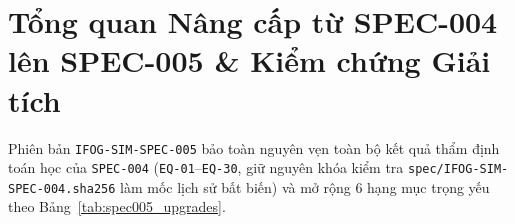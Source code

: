 \documentclass[11pt, a4paper]{article}
\begin{document}
\begin{abstract}
\noindent Tài liệu \texttt{IFOG-SIM-SPEC-005} nâng cấp toàn diện chuẩn \texttt{IFOG-SIM-SPEC-004} (bảo toàn 100\% toàn bộ 30 phương trình nền tảng \texttt{EQ-01}--\texttt{EQ-30} và 4 cổng nghiệm thu Gate 1--4) để đưa nền tảng \texttt{ifog-vproto} trở thành một nguyên mẫu ảo công nghiệp hoàn chỉnh cho con quay hồi chuyển sợi quang giao thoa vòng kín (Closed-Loop IFOG). Phiên bản 5.0 bổ sung chính thức 11 phương trình mới (\texttt{EQ-31}--\texttt{EQ-41}) gồm: (i) thuật toán điều chế \& giải điều chế **DSP 6 trạng thái đối xứng** có góc tối ưu triệt xuyên âm/RAM $\alpha^* = \pi/3$, ba kênh trực giao $(e_\Omega, e_{V_\pi}, e_{\text{asym}})$ và cơ chế chống bão hòa tích phân (\emph{anti-windup}); (ii) **6 kịch bản xác minh miền thời gian** (\texttt{TD-01}--\texttt{TD-06}) khai thác thanh ghi nội bộ Tầng 2 (\texttt{dsp\_trace.bin}) cho quá độ dưới chu kỳ $\tau$, đáp ứng bước \& băng thông $-3\text{ dB}$, sốc nhiệt $V_\pi$, quay tốc độ cao $300\text{--}700^\circ/\text{s}$, sốc nhiệt Shupe kèm bộ lọc bù và chu kỳ giới hạn lượng tử; (iii) **5 bài toán kỹ thuật hệ thống \& sản xuất** (\texttt{ENG-01}--\texttt{ENG-05}) gồm định cỡ phần cứng ENOB/Aperture Jitter/TIA--SLD, đồng mô phỏng SystemC-AMS **IMU 3 trục dùng chung SLD và đường nguồn**, sai số chỉnh lưu rung động VRE \& độ nhạy từ trường Faraday (tính toán chắn từ Mu-metal), tiêm lỗi \& kiểm thử **FPGA BIT/FDIR**, phân tích tỷ lệ đạt chuẩn dây chuyền **Monte Carlo Yield** ($C_{pk}$) và bộ dữ liệu hiệu chuẩn nhiệt ảo $-40^\circ\text{C}..+85^\circ\text{C}$ kiểm chứng đa thức + EKF.
\end{abstract}

\tableofcontents
\vspace{0.25cm}

\section{Tổng quan Nâng cấp từ SPEC-004 lên SPEC-005 \& Kiểm chứng Giải tích}

Phiên bản \texttt{IFOG-SIM-SPEC-005} bảo toàn nguyên vẹn toàn bộ kết quả thẩm định toán học của \texttt{SPEC-004} (\texttt{EQ-01}--\texttt{EQ-30}, giữ nguyên khóa kiểm tra \texttt{spec/IFOG-SIM-SPEC-004.sha256} làm mốc lịch sử bất biến) và mở rộng 6 hạng mục trọng yếu theo Bảng~\ref{tab:spec005_upgrades}.
\end{document}
